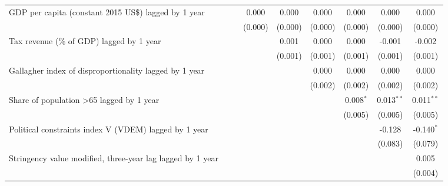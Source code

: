 \begin{tabular}{lcccccccc}
   GDP per capita (constant 2015 US\$) lagged by 1 year       &                &                & 0.000          & 0.000         & 0.000          & 0.000          & 0.000          & 0.000\\   
                                                              &                &                & (0.000)        & (0.000)       & (0.000)        & (0.000)        & (0.000)        & (0.000)\\   
   Tax revenue (\% of GDP) lagged by 1 year                   &                &                &                & 0.001         & 0.000          & 0.000          & -0.001         & -0.002\\   
                                                              &                &                &                & (0.001)       & (0.001)        & (0.001)        & (0.001)        & (0.001)\\   
   Gallagher index of disproportionality lagged by 1 year     &                &                &                &               & 0.000          & 0.000          & 0.000          & 0.000\\   
                                                              &                &                &                &               & (0.002)        & (0.002)        & (0.002)        & (0.002)\\   
   Share of population >65 lagged by 1 year                   &                &                &                &               &                & 0.008$^{*}$    & 0.013$^{**}$   & 0.011$^{**}$\\   
                                                              &                &                &                &               &                & (0.005)        & (0.005)        & (0.005)\\   
   Political constraints index V (VDEM) lagged by 1 year      &                &                &                &               &                &                & -0.128         & -0.140$^{*}$\\   
                                                              &                &                &                &               &                &                & (0.083)        & (0.079)\\   
   Stringency value modified, three-year lag lagged by 1 year &                &                &                &               &                &                &                & 0.005\\   
                                                              &                &                &                &               &                &                &                & (0.004)\\   

\end{tabular}
